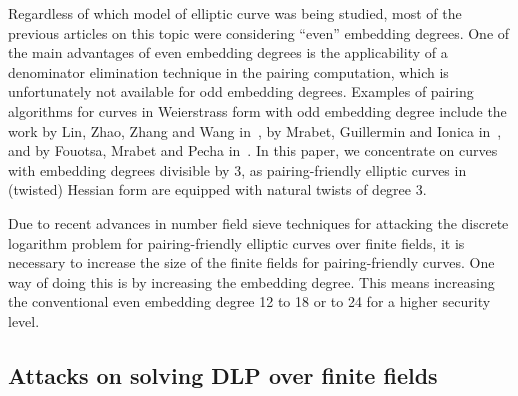Regardless of which model of elliptic curve was being studied,
most of the previous articles on this topic were considering ``even'' embedding degrees.
One of the main advantages of even embedding degrees is the applicability of a denominator elimination technique in the pairing computation,
which is unfortunately not available for odd embedding degrees.
Examples of pairing algorithms for curves in Weierstrass form with odd embedding degree include
the work by Lin, Zhao, Zhang and Wang in~\cite{2008/lin}, by Mrabet, Guillermin and Ionica in~\cite{2009/deg15},
and by Fouotsa, Mrabet and Pecha in~\cite{2016/degodd}.
In this paper, we concentrate on curves with embedding degrees divisible by 3,
as pairing-friendly elliptic curves in (twisted) Hessian form are equipped with natural twists of degree 3.

Due to recent advances in number field sieve techniques for attacking the discrete logarithm problem for pairing-friendly elliptic curves over finite fields,
it is necessary to increase the size of the finite fields for pairing-friendly curves.
One way of doing this is by increasing the embedding degree.
This means increasing the conventional even embedding degree 12 to 18 or to 24 for a higher security level.




\subsection{Attacks on solving DLP over finite fields}

